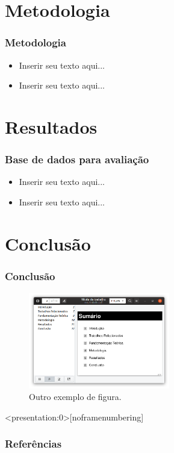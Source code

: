 \documentclass[aspectratio=34, 14pt]{latex-slides}
\begin{document}
    \section{Metodologia}
    \begin{frame}
        \frametitle{Metodologia}

        \begin{itemize}
            \item Inserir seu texto aqui...
            \item Inserir seu texto aqui...
        \end{itemize}
    \end{frame}

    \section{Resultados}
    \begin{frame}
        \frametitle{Base de dados para avaliação}

        \begin{itemize}
            \item Inserir seu texto aqui...
            \item Inserir seu texto aqui...
        \end{itemize}
    \end{frame}

    \section{Conclusão}
    \begin{frame}
        \frametitle{Conclusão}

        \setcounter{figure}{3}
        \begin{figure}[!t]
            \centering
            \includegraphics[width=0.55\textwidth]{./figs/figura-exemplo2}
            \caption{Outro exemplo de figura.}
            \label{fig:outro_exemplo_figura}
        \end{figure}
    \end{frame}

    \begin{frame}<presentation:0>[noframenumbering] %
        \frametitle{Referências}

        \small
        
    \end{frame}

    \begin{frame}
        \titlepage
    \end{frame}
\end{document}
